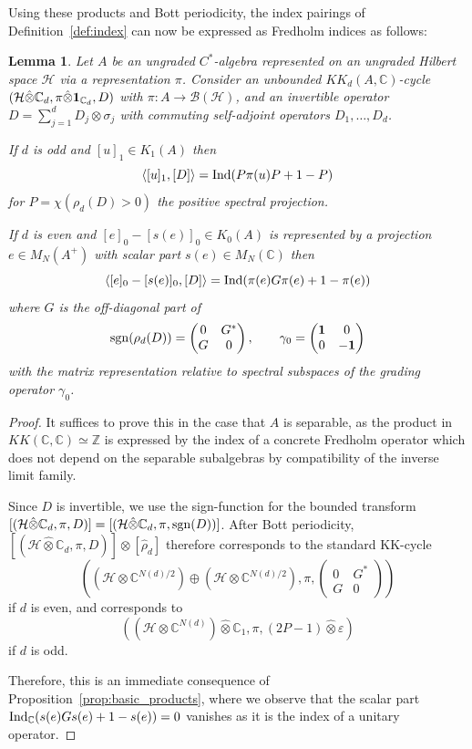 \documentclass[12pt]{amsart}
\newtheorem{lemma}[theorem]{Lemma}
\newcommand{\CM}{{\mathbb C}}
\newcommand{\ZM}{{\mathbb Z}}
\newcommand{\Bb}{{\mathcal B}}
\newcommand{\Hh}{{\mathcal H}}
\newcommand{\one}{{\bf 1}}
\newcommand{\Ind}{{\rm Ind}}
\newcommand{\sgn}{{\rm sgn}}
\newcommand{\ep}{\varepsilon}
\begin{document}
Using these products and Bott periodicity, the index pairings of Definition~\ref{def:index} can now be expressed as Fredholm indices as follows:

\begin{lemma}\label{lemma:index_kk_product}
Let $A$ be an ungraded $C^*$-algebra represented on an ungraded Hilbert space $\Hh$ via a representation $\pi$. Consider an unbounded $KK_d(A, \CM)$-cycle $(\Hh\hat{\otimes} \CM_d, \pi\hat{\otimes}\one_{\CM_d}, D)$ with $\pi:A\to \Bb(\Hh)$, and an invertible operator $D=\sum_{j=1}^d D_j\otimes \sigma_j$ with commuting self-adjoint operators $D_1,\ldots,D_d$.

If $d$ is odd and $[u]_1\in K_1(A)$ then
\begin{equation}
\label{eq:oddpairing}
\langle [u]_1, [D] \rangle = \Ind(P \pi(u) P +1- P)
\end{equation}
for $P=\chi(\rho_d(D)>0)$ the positive spectral projection.

If $d$ is even and $[e]_0-[s(e)]_0\in K_0(A)$ is represented by a projection $e\in M_N(A^+)$ with scalar part $s(e)\in M_N(\CM)$ then
\begin{equation}
\label{eq:evenpairing}
\langle [e]_0-[s(e)]_0, [D]\rangle = \Ind(\pi(e) G\pi(e)+ 1-\pi(e))
\end{equation}
where $G$ is the off-diagonal part of $$\sgn(\rho_d(D))=\begin{pmatrix}
    0 & G^* \\ G & 0
\end{pmatrix}, \qquad \gamma_0=\begin{pmatrix}
    \one & 0 \\ 0 & -\one
\end{pmatrix}$$
with the matrix representation relative to spectral subspaces of the grading operator $\gamma_0$. 
\end{lemma}
\begin{proof}
It suffices to prove this in the case that $A$ is separable, as the product in $KK(\CM,\CM)\simeq \ZM$ is expressed by the index of a concrete Fredholm operator which does not depend on the separable subalgebras by compatibility of the inverse limit family. 

Since $D$ is invertible, we use the sign-function for the bounded transform $[(\Hh\hat{\otimes}\CM_d, \pi, D)]=[(\Hh\hat{\otimes}\CM_d, \pi, \sgn(D))]$.
After Bott periodicity, $[(\Hh\hat{\otimes}\CM_d, \pi, D)] \otimes [\hat{\rho}_d]$ therefore corresponds to the standard KK-cycle
$$((\Hh\otimes \CM^{N(d)/2})\oplus (\Hh\otimes \CM^{N(d)/2}), \pi, \begin{pmatrix}
    0 & G^*\\ G & 0
\end{pmatrix})$$
if $d$ is even, and corresponds to
$$((\Hh\otimes \CM^{N(d)})\hat{\otimes}\CM_1, \pi, (2P-1)\hat{\otimes}\ep)$$
if $d$ is odd. 

Therefore, this is an immediate consequence of Proposition~\ref{prop:basic_products}, where we observe that the scalar part $\Ind_\CM(s(e) G s(e) + 1-s(e))=0$ vanishes as it is the index of a unitary operator.
\end{proof}
\end{document}
